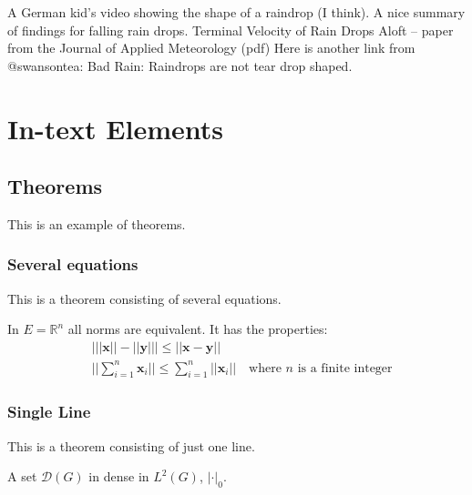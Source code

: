 A German kid’s video showing the shape of a raindrop (I think).
A nice summary of findings for falling rain drops.
Terminal Velocity of Rain Drops Aloft – paper from the Journal of Applied Meteorology (pdf)
Here is another link from @swansontea: Bad Rain: Raindrops are not tear drop shaped.


\chapter{In-text Elements}

\section{Theorems}

This is an example of theorems.

\subsection{Several equations}
This is a theorem consisting of several equations.

\begin{theorem}
	In $E=\mathbb{R}^n$ all norms are equivalent. It has the properties:
	\begin{align}
		& \big| ||\mathbf{x}|| - ||\mathbf{y}|| \big|\leq || \mathbf{x}- \mathbf{y}||\\
		&  ||\sum_{i=1}^n\mathbf{x}_i||\leq \sum_{i=1}^n||\mathbf{x}_i||\quad\text{where $n$ is a finite integer}
	\end{align}
\end{theorem}

\subsection{Single Line}
This is a theorem consisting of just one line.

\begin{theorem}
	A set $\mathcal{D}(G)$ in dense in $L^2(G)$, $|\cdot|_0$. 
\end{theorem}


